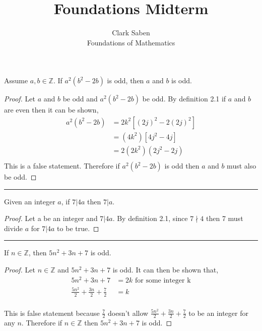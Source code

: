 \documentclass[12pt]{article}
\newenvironment{theorem}[2][Theorem]{\begin{trivlist}
\item[\hskip \labelsep {\bfseries #1}\hskip \labelsep {\bfseries #2.}]}{\end{trivlist}}
\begin{document}
 
 
\title{Foundations Midterm}%
\author{Clark Saben\\ %
Foundations of Mathematics} %
 
\maketitle

 
\begin{theorem}{1}
	Assume $a,b \in \mathbb{Z}$. If $a^2 \left(b^2 -2b \right)$ is odd, then $a$ and $b$ 
	is odd.
\end{theorem}
\begin{proof}
	Let $a$ and $b$ be odd and $a^2 \left(b^2 -2b \right)$ be odd. By definition 2.1
	if $a$ and $b$ are even then it can be shown,
	\begin{align*}
		{a^2 \left(b^2 -2b \right)} &= 2k^2 [\left(2j\right)^2 -2 \left(2j \right)^2] \\
					    &= \left(4k^2\right)[4j^2 - 4j]\\
					    &= 2  \left(2k^2\right) \left(2j^2 - 2j \right) \\
	\end{align*}
	This is a  false statement. Therefore if $a^2 \left(b^2 -2b \right)$ is odd then $a$ and $b$ must also
	be odd.
\end{proof}

\hrule

\begin{theorem}{2}
	Given an integer $a$, if $7|4a$ then $7|a$.
\end{theorem}
\begin{proof}
	Let a be an integer and $7|4a$. By definition 2.1, since $7\nmid4$ then 7 must
	divide $a$ for $7|4a$ to be true. 
\end{proof}

\hrule

\begin{theorem}{3}
	If $n\in \mathbb{Z}$, then $5n^2 + 3n +7$ is odd.
\end{theorem}
\begin{proof}
	Let $n \in \mathbb{Z}$ and $5n^2 + 3n +7$ is odd. It can then be shown that,\\
	\begin{align}
		{5n^2 + 3n + 7 }&= 2k \text{ for some integer k}\\
		\frac{5n^2}{2} + \frac{3n}{2} + \frac{7}{2}&= k\\
	\end{align}

	This is false statement because $\frac{7}{2}$ doesn't allow 
	$\frac{5n^2}{2} + \frac{3n}{2} + \frac{7}{2}$ to be an integer
	for any $n$. Therefore if $n \in \mathbb{Z}$ then $5n^2 + 3n +7$ is odd.
\end{proof}
\end{document}
